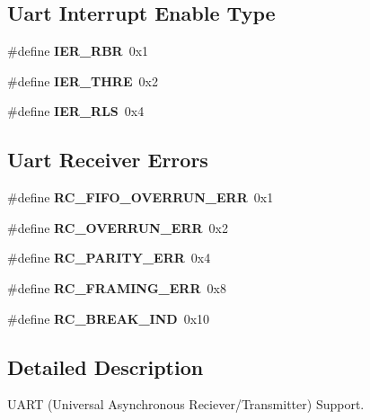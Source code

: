 \subsection*{Uart Interrupt Enable Type}
\begin{DoxyCompactItemize}
\item 
\mbox{\label{group__rtl22xx__uart_ga6f8e43123ccd9f9be70e2e4e761fd8bf}} 
\#define {\bfseries I\+E\+R\+\_\+\+R\+BR}~0x1
\item 
\mbox{\label{group__rtl22xx__uart_ga22682c3d4571d7a79ed0ca2bc88a15a6}} 
\#define {\bfseries I\+E\+R\+\_\+\+T\+H\+RE}~0x2
\item 
\mbox{\label{group__rtl22xx__uart_gaec947c63128590c8f615862ee9c2c953}} 
\#define {\bfseries I\+E\+R\+\_\+\+R\+LS}~0x4
\end{DoxyCompactItemize}
\subsection*{Uart Receiver Errors}
\begin{DoxyCompactItemize}
\item 
\mbox{\label{group__rtl22xx__uart_gaf9d8e030bf858466401182b59942b1bb}} 
\#define {\bfseries R\+C\+\_\+\+F\+I\+F\+O\+\_\+\+O\+V\+E\+R\+R\+U\+N\+\_\+\+E\+RR}~0x1
\item 
\mbox{\label{group__rtl22xx__uart_gad60234827175c17e3c352105bcf34ebe}} 
\#define {\bfseries R\+C\+\_\+\+O\+V\+E\+R\+R\+U\+N\+\_\+\+E\+RR}~0x2
\item 
\mbox{\label{group__rtl22xx__uart_ga2ca6f118a30aae1330d0432cae7453a0}} 
\#define {\bfseries R\+C\+\_\+\+P\+A\+R\+I\+T\+Y\+\_\+\+E\+RR}~0x4
\item 
\mbox{\label{group__rtl22xx__uart_ga8fe21eea4abb091aa1531ee7d713ad24}} 
\#define {\bfseries R\+C\+\_\+\+F\+R\+A\+M\+I\+N\+G\+\_\+\+E\+RR}~0x8
\item 
\mbox{\label{group__rtl22xx__uart_ga599b3296664ece171257843fdaff4b4e}} 
\#define {\bfseries R\+C\+\_\+\+B\+R\+E\+A\+K\+\_\+\+I\+ND}~0x10
\end{DoxyCompactItemize}


\subsection{Detailed Description}
U\+A\+RT (Universal Asynchronous Reciever/\+Transmitter) Support. 

